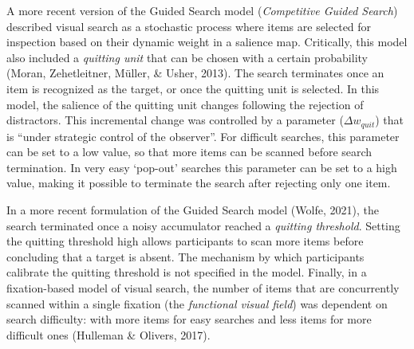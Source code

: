 \documentclass[12pt,twoside]{reedthesis}
\begin{document}
A more recent version of the Guided Search model (\emph{Competitive Guided Search}) described visual search as a stochastic process where items are selected for inspection based on their dynamic weight in a salience map. Critically, this model also included a \emph{quitting unit} that can be chosen with a certain probability (Moran, Zehetleitner, Müller, \& Usher, 2013). The search terminates once an item is recognized as the target, or once the quitting unit is selected. In this model, the salience of the quitting unit changes following the rejection of distractors. This incremental change was controlled by a parameter (\(\Delta w_{quit}\)) that is ``under strategic control of the observer''. For difficult searches, this parameter can be set to a low value, so that more items can be scanned before search termination. In very easy `pop-out' searches this parameter can be set to a high value, making it possible to terminate the search after rejecting only one item.

In a more recent formulation of the Guided Search model (Wolfe, 2021), the search terminated once a noisy accumulator reached a \emph{quitting threshold}. Setting the quitting threshold high allows participants to scan more items before concluding that a target is absent. The mechanism by which participants calibrate the quitting threshold is not specified in the model. Finally, in a fixation-based model of visual search, the number of items that are concurrently scanned within a single fixation (the \emph{functional visual field}) was dependent on search difficulty: with more items for easy searches and less items for more difficult ones (Hulleman \& Olivers, 2017).
\end{document}
